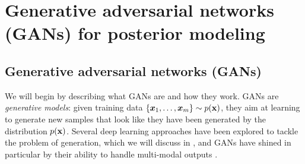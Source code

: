 




\section{Generative adversarial networks (GANs) for posterior modeling}\label{s:GANs_posterior}

\subsection{Generative adversarial networks (GANs)}
We will begin by describing what GANs are and how they work. GANs are \textit{generative models}: given training data $\{{\bm{x}}_1,\ldots, {\bm{x}}_m\} \sim p({\mathbf{x}})$, they aim at learning to generate new samples that look like they have been generated by the distribution $p({\mathbf{x}})$. Several deep learning approaches have been explored to tackle the problem of generation, which we will discuss in , and GANs have shined in particular by their ability to handle multi-modal outputs \citep{goodfellow2016nips}.

